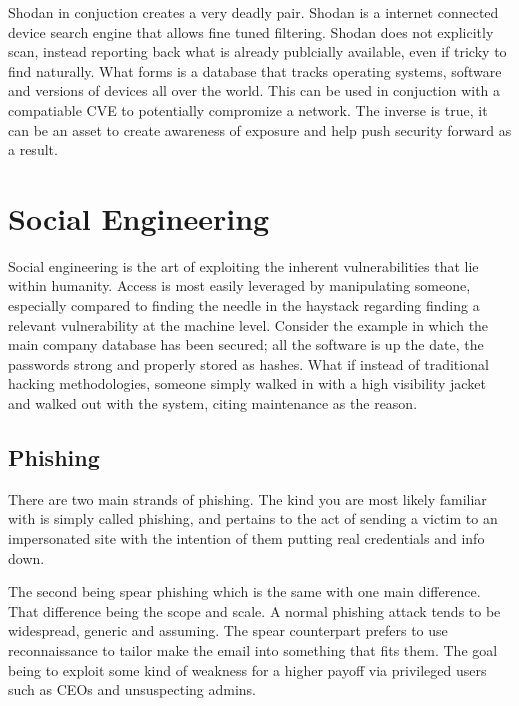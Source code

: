 
Shodan in conjuction creates a very deadly pair. Shodan is a internet connected device search engine that allows fine tuned filtering.
Shodan does not explicitly scan, instead reporting back what is already publcially available, even if tricky to find naturally. What forms is a database that 
tracks operating systems, software and versions of devices all over the world. This can be used in conjuction with a compatiable CVE to potentially compromize a network.
The inverse is true, it can be an asset to create awareness of exposure and help push security forward as a result.


\section{Social Engineering}
Social engineering is the art of exploiting the inherent vulnerabilities that lie within humanity. Access is most easily leveraged by manipulating someone, especially compared to finding the needle in the haystack regarding finding a relevant vulnerability at the machine level. 
Consider the example in which the main company database has been secured; all the software is up the date, the passwords strong and properly stored as hashes. What if instead of traditional hacking methodologies, someone simply walked in with a high visibility jacket and walked out with the system, 
citing maintenance as the reason. \citep{AssignmentSecurityForensicsPaper}



\subsection{Phishing}

There are two main strands of phishing. The kind you are most likely familiar with is simply called phishing, and pertains to the act of sending a victim to an impersonated site with the intention of them putting real credentials and info down. 

The second being spear phishing which is the same with one main difference. That difference being the scope and scale. A normal phishing attack tends to be widespread, generic and assuming. The spear counterpart prefers to use reconnaissance to tailor make the email into something that fits them. The goal being to exploit some kind of weakness for a higher payoff via privileged users such as CEOs and unsuspecting admins.


